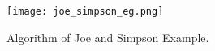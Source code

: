 \begin{figure}[h!]
	\centering
	\texttt{[image: joe\_simpson\_eg.png]}
	\caption{Algorithm of Joe and Simpson \cite{joe1987corrections} Example.}
	\label{fig:joe}
\end{figure}



